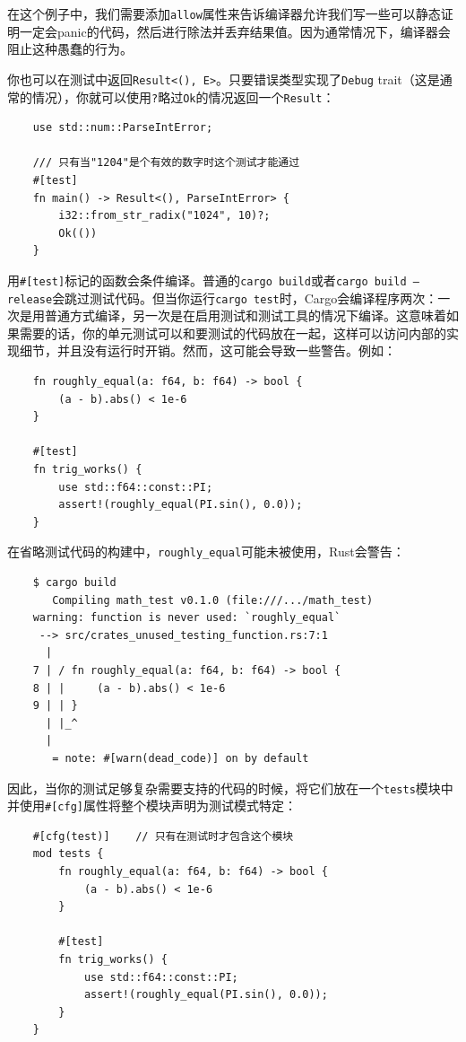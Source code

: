 在这个例子中，我们需要添加\texttt{allow}属性来告诉编译器允许我们写一些可以静态证明一定会panic的代码，然后进行除法并丢弃结果值。因为通常情况下，编译器会阻止这种愚蠢的行为。

你也可以在测试中返回\texttt{Result<(), E>}。只要错误类型实现了\texttt{Debug} trait（这是通常的情况），你就可以使用\texttt{?}略过\texttt{Ok}的情况返回一个\texttt{Result}：
\begin{verbatim}
    use std::num::ParseIntError;

    /// 只有当"1204"是个有效的数字时这个测试才能通过
    #[test]
    fn main() -> Result<(), ParseIntError> {
        i32::from_str_radix("1024", 10)?;
        Ok(())
    }
\end{verbatim}

用\texttt{\#[test]}标记的函数会条件编译。普通的\texttt{cargo build}或者\texttt{cargo build --release}会跳过测试代码。但当你运行\texttt{cargo test}时，Cargo会编译程序两次：一次是用普通方式编译，另一次是在启用测试和测试工具的情况下编译。这意味着如果需要的话，你的单元测试可以和要测试的代码放在一起，这样可以访问内部的实现细节，并且没有运行时开销。然而，这可能会导致一些警告。例如：
\begin{verbatim}
    fn roughly_equal(a: f64, b: f64) -> bool {
        (a - b).abs() < 1e-6
    }

    #[test]
    fn trig_works() {
        use std::f64::const::PI;
        assert!(roughly_equal(PI.sin(), 0.0));
    }
\end{verbatim}

在省略测试代码的构建中，\texttt{roughly\_equal}可能未被使用，Rust会警告：
\begin{verbatim}
    $ cargo build
       Compiling math_test v0.1.0 (file:///.../math_test)
    warning: function is never used: `roughly_equal`
     --> src/crates_unused_testing_function.rs:7:1
      |
    7 | / fn roughly_equal(a: f64, b: f64) -> bool {
    8 | |     (a - b).abs() < 1e-6    
    9 | | }
      | |_^
      |
       = note: #[warn(dead_code)] on by default
\end{verbatim}

因此，当你的测试足够复杂需要支持的代码的时候，将它们放在一个\texttt{tests}模块中并使用\texttt{\#[cfg]}属性将整个模块声明为测试模式特定：
\begin{verbatim}
    #[cfg(test)]    // 只有在测试时才包含这个模块
    mod tests {
        fn roughly_equal(a: f64, b: f64) -> bool {
            (a - b).abs() < 1e-6
        }

        #[test]
        fn trig_works() {
            use std::f64::const::PI;
            assert!(roughly_equal(PI.sin(), 0.0));
        }
    }
\end{verbatim}

